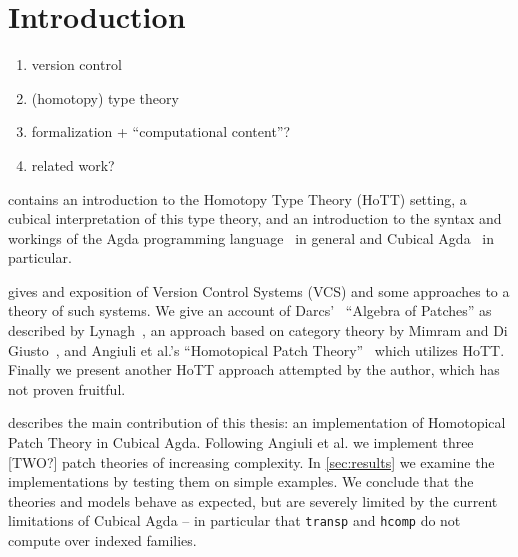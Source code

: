 \chapter{Introduction}

\begin{enumerate}
\item version control
\item (homotopy) type theory
\item formalization + ``computational content''?
\item related work?
\end{enumerate}

 contains an introduction to the Homotopy Type Theory (HoTT)
setting, a cubical interpretation of this type theory, and an introduction to
the syntax and workings of the Agda programming language~\cite{Agda} in general and Cubical
Agda~\cite{vezzosi2021cubical} in particular.

 gives and exposition of Version Control Systems (VCS) and some
approaches to a theory of such systems. We give an account of
Darcs'~\cite{Darcs} ``Algebra of Patches'' as described by
Lynagh~\cite{Lynagh2006}, an approach based on category theory by Mimram and Di
Giusto~\cite{Categorical2013}, and Angiuli et al.'s ``Homotopical Patch
Theory''~\cite{Angiuli2016} which utilizes HoTT. Finally we present another
HoTT approach attempted by the author, which has not proven fruitful.

 describes the main contribution of this thesis: an
implementation of Homotopical Patch Theory in Cubical Agda. Following Angiuli et
al. we implement three [TWO?] patch theories of increasing complexity. In
\autoref{sec:results} we examine the implementations by testing them on simple
examples. We conclude that the theories and models behave as expected, but are
severely limited by the current limitations of Cubical Agda -- in particular
that \texttt{transp} and \texttt{hcomp} do not compute over indexed families.